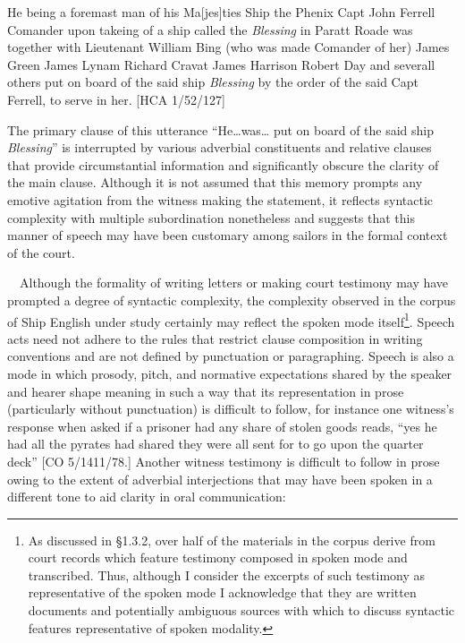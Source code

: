 \begin{styleStandard}
He being a foremast man of his Ma[jes]ties Ship the Phenix Capt John Ferrell Comander upon takeing of a ship called the \textit{Blessing} in Paratt Roade was together with Lieutenant William Bing (who was made Comander of her) James Green James Lynam Richard Cravat James Harrison Robert Day and severall others put on board of the said ship \textit{Blessing} by the order of the said Capt Ferrell, to serve in her. [HCA 1/52/127]
\end{styleStandard}

\begin{styleStandard}
The primary clause of this utterance “He…was… put on board of the said ship \textit{Blessing}” is interrupted by various adverbial constituents and relative clauses that provide circumstantial information and significantly obscure the clarity of the main clause. Although it is not assumed that this memory prompts any emotive agitation from the witness making the statement, it reflects syntactic complexity with multiple subordination nonetheless and suggests that this manner of speech may have been customary among sailors in the formal context of the court. 
\end{styleStandard}

\begin{styleStandard}
\ \ Although the formality of writing letters or making court testimony may have prompted a degree of syntactic complexity, the complexity observed in the corpus of Ship English under study certainly may reflect the spoken mode itself\footnote{ As discussed in §1.3.2, over half of the materials in the corpus derive from court records which feature testimony composed in spoken mode and transcribed. Thus, although I consider the excerpts of such testimony as representative of the spoken mode I acknowledge that they are written documents and potentially ambiguous sources with which to discuss syntactic features representative of spoken modality. }. Speech acts need not adhere to the rules that restrict clause composition in writing conventions and are not defined by punctuation or paragraphing. Speech is also a mode in which prosody, pitch, and normative expectations shared by the speaker and hearer shape meaning in such a way that its representation in prose (particularly without punctuation) is difficult to follow, for instance one witness’s response when asked if a prisoner had any share of stolen goods reads, “yes he had all the pyrates had shared they were all sent for to go upon the quarter deck” [CO 5/1411/78.] Another witness testimony is difficult to follow in prose owing to the extent of adverbial interjections that may have been spoken in a different tone to aid clarity in oral communication:
\end{styleStandard}

